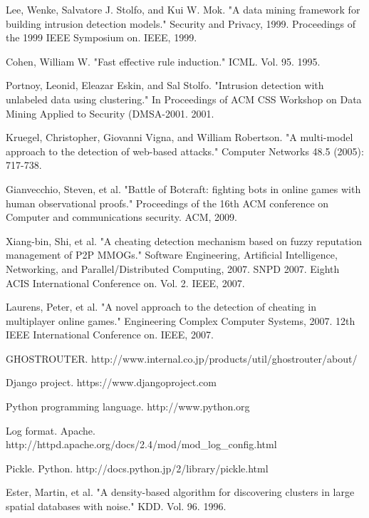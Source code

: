 \begin{thebibliography}{99}

Lee, Wenke, Salvatore J. Stolfo, and Kui W. Mok. "A data mining framework for building intrusion detection models." Security and Privacy, 1999. Proceedings of the 1999 IEEE Symposium on. IEEE, 1999.

Cohen, William W. "Fast effective rule induction." ICML. Vol. 95. 1995.

Portnoy, Leonid, Eleazar Eskin, and Sal Stolfo. "Intrusion detection with unlabeled data using clustering." In Proceedings of ACM CSS Workshop on Data Mining Applied to Security (DMSA-2001. 2001.

Kruegel, Christopher, Giovanni Vigna, and William Robertson. "A multi-model approach to the detection of web-based attacks." Computer Networks 48.5 (2005): 717-738.

Gianvecchio, Steven, et al. "Battle of Botcraft: fighting bots in online games with human observational proofs." Proceedings of the 16th ACM conference on Computer and communications security. ACM, 2009.

Xiang-bin, Shi, et al. "A cheating detection mechanism based on fuzzy reputation management of P2P MMOGs." Software Engineering, Artificial Intelligence, Networking, and Parallel/Distributed Computing, 2007. SNPD 2007. Eighth ACIS International Conference on. Vol. 2. IEEE, 2007.

Laurens, Peter, et al. "A novel approach to the detection of cheating in multiplayer online games." Engineering Complex Computer Systems, 2007. 12th IEEE International Conference on. IEEE, 2007.

GHOSTROUTER. http://www.internal.co.jp/products/util/ghostrouter/about/

Django project. https://www.djangoproject.com

Python programming language. http://www.python.org

Log format. Apache. http://httpd.apache.org/docs/2.4/mod/mod\_log\_config.html

Pickle. Python. http://docs.python.jp/2/library/pickle.html

Ester, Martin, et al. "A density-based algorithm for discovering clusters in large spatial databases with noise." KDD. Vol. 96. 1996.


\end{thebibliography}
